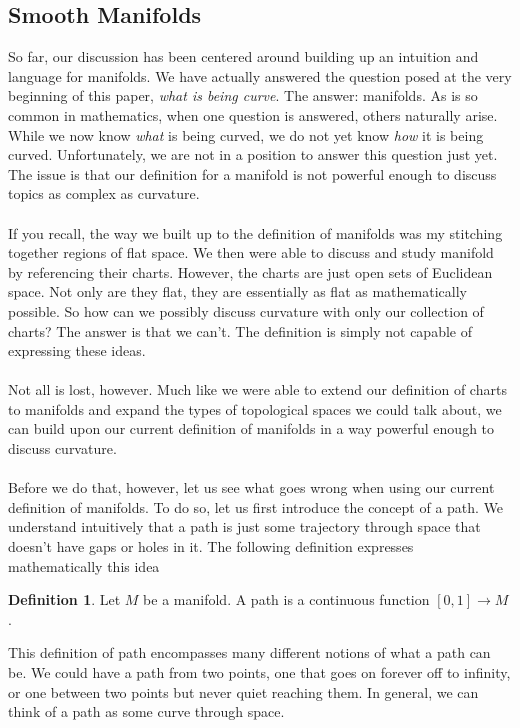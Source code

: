 \documentclass[]{article}
\newcommand\<{\ensuremath{\left\langle}}
\renewcommand\>{\ensuremath{\right\rangle}}
\newcommand{\RR}{\ensuremath{\mathbb{R}}}
\theoremstyle{definition}
\newtheorem{definition}{Definition}[section]
\theoremstyle{definition}
\begin{document}
	
	\subsection*{Smooth Manifolds}
	So far, our discussion has been centered around building up an intuition and language for manifolds. We have actually answered the question posed at the very beginning of this paper, \textit{what is being curve}. The answer: manifolds. As is so common in mathematics, when one question is answered, others naturally arise. While we now know \textit{what} is being curved, we do not yet know \textit{how} it is being curved. Unfortunately, we are not in a position to answer this question just yet. The issue is that our definition for a manifold is not powerful enough to discuss topics as complex as curvature.\\
	\\
	If you recall, the way we built up to the definition of manifolds was my stitching together regions of flat space. We then were able to discuss and study manifold by referencing their charts. However, the charts are just open sets of Euclidean space. Not only are they flat, they are essentially as flat as mathematically possible. So how can we possibly discuss curvature with only our collection of charts? The answer is that we can't. The definition is simply not capable of expressing these ideas.\\
	\\
	Not all is lost, however. Much like we were able to extend our definition of charts to manifolds and expand the types of topological spaces we could talk about, we can build upon our current definition of manifolds in a way powerful enough to discuss curvature.\\
	\\
	Before we do that, however, let us see what goes wrong when using our current definition of manifolds. To do so, let us first introduce the concept of a path. We understand intuitively that a path is just some trajectory through space that doesn't have gaps or holes in it. The following definition expresses mathematically this idea
	\begin{definition}
		Let $M$ be a manifold. A path is a continuous function $[0, 1] \to M$.
	\end{definition}
	This definition of path encompasses many different notions of what a path can be. We could have a path from two points, one that goes on forever off to infinity, or one between two points but never quiet reaching them. In general, we can think of a path as some curve through space.\\
\end{document}
